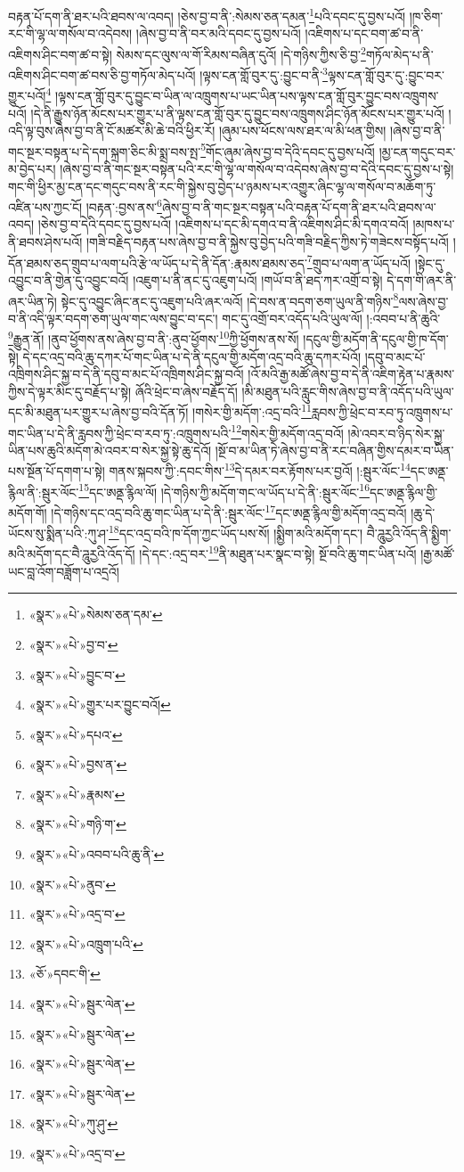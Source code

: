 བརྟན་པོ་དག་ནི་ཐར་པའི་ཐབས་ལ་འབད། །ཅེས་བྱ་བ་ནི་:སེམས་ཅན་དམན་\footnote{«སྣར་»«པེ་»སེམས་ཅན་དམ་}པའི་དབང་དུ་བྱས་པའོ། །ཁ་ཅིག་རང་གི་ལྷ་ལ་གསོལ་བ་འདེབས། །ཞེས་བྱ་བ་ནི་བར་མའི་དབང་དུ་བྱས་པའོ། །འཇིགས་པ་དང་བག་ཚ་བ་ནི་འཇིགས་ཤིང་བག་ཚ་བ་སྟེ། སེམས་དང་ལུས་ལ་གོ་རིམས་བཞིན་དུའོ། །དེ་གཉིས་ཀྱིས་ཅི་བྱ་\footnote{«སྣར་»«པེ་»བྱ་བ་}གཏོལ་མེད་པ་ནི་འཇིགས་ཤིང་བག་ཚ་བས་ཅི་བྱ་གཏོལ་མེད་པའོ། །ལྟས་ངན་གློ་བུར་དུ་:བྱུང་བ་ནི་\footnote{«སྣར་»«པེ་»བྱུང་བ་}ལྟས་ངན་གློ་བུར་དུ་:བྱུང་བར་གྱུར་པའོ།\footnote{«སྣར་»«པེ་»གྱུར་པར་བྱུང་བའོ།} །ལྟས་ངན་གློ་བུར་དུ་བྱུང་བ་ཡིན་ལ་འཁྲུགས་པ་ཡང་ཡིན་པས་ལྟས་ངན་གློ་བུར་བྱུང་བས་འཁྲུགས་པའོ། །དེ་ནི་རྒྱུས་ཉོན་མོངས་པར་གྱུར་པ་ནི་ལྟས་ངན་གློ་བུར་དུ་བྱུང་བས་འཁྲུགས་ཤིང་ཉོན་མོངས་པར་གྱུར་པའོ། །འདི་ལྟ་བུས་ཞེས་བྱ་བ་ནི་ངོ་མཚར་མི་ཆེ་བའི་ཕྱིར་རོ། །ཞུམ་པས་ཕོངས་ལས་ཐར་ལ་མི་ཕན་གྱིས། །ཞེས་བྱ་བ་ནི་གང་སྔར་བསྟན་པ་དེ་དག་སྐྲག་ཅིང་མི་སྨྲ་བས་སྤ་\footnote{«སྣར་»«པེ་»དཔའ་}གོང་ཞུམ་ཞེས་བྱ་བ་དེའི་དབང་དུ་བྱས་པའོ། །མྱ་ངན་གདུང་བར་མ་བྱེད་པར། །ཞེས་བྱ་བ་ནི་གང་སྔར་བསྟན་པའི་རང་གི་ལྷ་ལ་གསོལ་བ་འདེབས་ཞེས་བྱ་བ་དེའི་དབང་དུ་བྱས་པ་སྟེ། གང་གི་ཕྱིར་མྱ་ངན་དང་གདུང་བས་ནི་རང་གི་སྐྱེས་བུ་བྱེད་པ་ཉམས་པར་འགྱུར་ཞིང་ལྷ་ལ་གསོལ་བ་མཆོག་ཏུ་འཛིན་པས་ཀྱང་ངོ། །བརྟན་:བྱས་ནས་\footnote{«སྣར་»«པེ་»བྱས་ན་}ཞེས་བྱ་བ་ནི་གང་སྔར་བསྟན་པའི་བརྟན་པོ་དག་ནི་ཐར་པའི་ཐབས་ལ་འབད། །ཅེས་བྱ་བ་དེའི་དབང་དུ་བྱས་པའོ། །འཇིགས་པ་དང་མི་དགའ་བ་ནི་འཇིགས་ཤིང་མི་དགའ་བའོ། །མཁས་པ་ནི་ཐབས་ཤེས་པའོ། །གཟི་བརྗིད་བརྟན་པས་ཞེས་བྱ་བ་ནི་སྐྱེས་བུ་བྱེད་པའི་གཟི་བརྗིད་ཀྱིས་ཏེ་གཟེངས་བསྟོད་པའོ། །དོན་ཐམས་ཅད་གྲུབ་པ་ལག་པའི་རྩེ་ལ་ཡོད་པ་དེ་ནི་དོན་:རྣམས་ཐམས་ཅད་\footnote{«སྣར་»«པེ་»རྣམས་}གྲུབ་པ་ལག་ན་ཡོད་པའོ། །སྟེང་དུ་འབྱུང་བ་ནི་གྱེན་དུ་འབྱུང་བའོ། །འཇུག་པ་ནི་ནང་དུ་འཇུག་པའོ། །གཡོ་བ་ནི་ཐད་ཀར་འགྲོ་བ་སྟེ། དེ་དག་གི་ཞར་ནི་ཞར་ཡིན་ཏེ། སྟེང་དུ་འབྱུང་ཞིང་ནང་དུ་འཇུག་པའི་ཞར་ལའོ། །དེ་བས་ན་བདག་ཅག་ཡུལ་ནི་གཉིས་\footnote{«སྣར་»«པེ་»གཉི་ག་}ལས་ཞེས་བྱ་བ་ནི་འདི་ལྟར་བདག་ཅག་ཡུལ་གང་ལས་བྱུང་བ་དང་། གང་དུ་འགྲོ་བར་འདོད་པའི་ཡུལ་ལོ། །:འབབ་པ་ནི་ཆུའི་\footnote{«སྣར་»«པེ་»འབབ་པའི་ཆུ་ནི་}རྒྱུན་ནོ། །ནུབ་ཕྱོགས་ནས་ཞེས་བྱ་བ་ནི་:ནུབ་ཕྱོགས་\footnote{«སྣར་»«པེ་»ནུབ་}ཀྱི་ཕྱོགས་ནས་སོ། །དངུལ་གྱི་མདོག་ནི་དངུལ་གྱི་ཁ་དོག་སྟེ། དེ་དང་འདྲ་བའི་ཆུ་དཀར་པོ་གང་ཡིན་པ་དེ་ནི་དངུལ་གྱི་མདོག་འདྲ་བའི་ཆུ་དཀར་པོའོ། །དབུ་བ་མང་པོ་འཁྲིགས་ཤིང་སྐྱ་བ་དེ་ནི་དབུ་བ་མང་པོ་འཁྲིགས་ཤིང་སྐྱ་བའོ། །འོ་མའི་རྒྱ་མཚོ་ཞེས་བྱ་བ་དེ་ནི་འཇིག་རྟེན་པ་རྣམས་ཀྱིས་དེ་ལྟར་མིང་དུ་བརྗོད་པ་སྟེ། ཞོའི་ཕྲེང་བ་ཞེས་བརྗོད་དོ། །མི་མཐུན་པའི་རླུང་གིས་ཞེས་བྱ་བ་ནི་འདོད་པའི་ཡུལ་དང་མི་མཐུན་པར་གྱུར་པ་ཞེས་བྱ་བའི་དོན་ཏོ། །གསེར་གྱི་མདོག་:འདྲ་བའི་\footnote{«སྣར་»«པེ་»འདྲ་བ་}རླབས་ཀྱི་ཕྲེང་བ་རབ་ཏུ་འཁྲུགས་པ་གང་ཡིན་པ་དེ་ནི་རླབས་ཀྱི་ཕྲེང་བ་རབ་ཏུ་:འཁྲུགས་པའི་\footnote{«སྣར་»«པེ་»འཁྲུག་པའི་}གསེར་གྱི་མདོག་འདྲ་བའོ། །མེ་འབར་བ་ཉིད་སེར་སྐྱ་ཡིན་པས་ཆུའི་མདོག་མེ་འབར་བ་སེར་སྐྱ་སྟེ་ཆུ་དེའོ། །སྔོ་བ་མ་ཡིན་ཏེ་ཞེས་བྱ་བ་ནི་རང་བཞིན་གྱིས་དམར་བ་ཡིན་པས་སྔོན་པོ་དགག་པ་སྟེ། གནས་སྐབས་ཀྱི་:དབང་གིས་\footnote{«ཅོ་»དབང་གི་}དེ་དམར་བར་རྟོགས་པར་བྱའོ། །:སྦུར་ལོང་\footnote{«སྣར་»«པེ་»སྦུར་ལེན་}དང་ཨནྡ་རྙིལ་ནི་:སྦུར་ལོང་\footnote{«སྣར་»«པེ་»སྦུར་ལེན་}དང་ཨནྡ་རྙིལ་ལོ། །དེ་གཉིས་ཀྱི་མདོག་གང་ལ་ཡོད་པ་དེ་ནི་:སྦུར་ལོང་\footnote{«སྣར་»«པེ་»སྦུར་ལེན་}དང་ཨནྡ་རྙིལ་གྱི་མདོག་གོ། །དེ་གཉིས་དང་འདྲ་བའི་ཆུ་གང་ཡིན་པ་དེ་ནི་:སྦུར་ལོང་\footnote{«སྣར་»«པེ་»སྦུར་ལེན་}དང་ཨནྡ་རྙིལ་གྱི་མདོག་འདྲ་བའོ། །ཆུ་དེ་ཡོངས་སུ་སྨིན་པའི་:ཀུ་ཤ་\footnote{«སྣར་»«པེ་»ཀུ་ཤུ་}དང་འདྲ་བའི་ཁ་དོག་ཀྱང་ཡོད་པས་སོ། །སྨྱིག་མའི་མདོག་དང་། བཻ་ཌཱུརྱའི་འོད་ནི་སྨྱིག་མའི་མདོག་དང་བཻ་ཌཱུརྱའི་འོད་དོ། །དེ་དང་:འདྲ་བར་\footnote{«སྣར་»«པེ་»འདྲ་བ་}ནི་མཐུན་པར་སྣང་བ་སྟེ། སྔོ་བའི་ཆུ་གང་ཡིན་པའོ། །རྒྱ་མཚོ་ཡང་བླ་འོག་བཟློག་པ་འདྲའོ། 